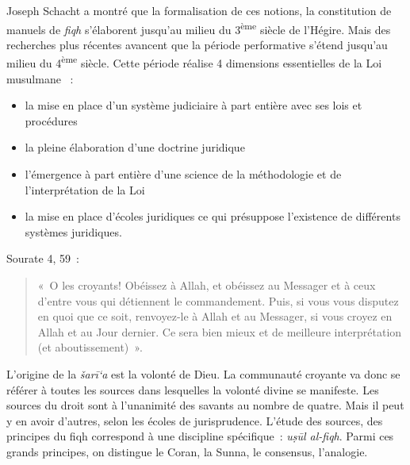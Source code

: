 Joseph Schacht a montré que la formalisation de ces notions, la
constitution de manuels de \emph{fiqh} s'élaborent jusqu'au milieu du
3\textsuperscript{ème} siècle de l'Hégire. Mais des recherches plus
récentes avancent que la période performative s'étend jusqu'au milieu du
4\textsuperscript{ème} siècle. Cette période réalise 4 dimensions
essentielles de la Loi musulmane
~:

\begin{itemize}
\item
  la mise en place d'un système judiciaire à part entière avec ses lois
  et procédures
\item
  la pleine élaboration d'une doctrine juridique
\item
  l'émergence à part entière d'une science de la méthodologie et de
  l'interprétation de la Loi
\item
  la mise en place d'écoles juridiques ce qui présuppose l'existence de
  différents systèmes juridiques.
\end{itemize}


Sourate 4, 59~:


\begin{quote}
«~O les croyants! Obéissez à Allah, et obéissez au Messager et à ceux
d'entre vous qui détiennent le commandement. Puis, si vous vous disputez
en quoi que ce soit, renvoyez-le à Allah et au Messager, si vous croyez
en Allah et au Jour dernier. Ce sera bien mieux et de meilleure
interprétation (et aboutissement)~».
\end{quote}

L'origine de la \emph{šarī`a} est la volonté de Dieu. La communauté
croyante va donc se référer à toutes les sources dans lesquelles la
volonté divine se manifeste. Les sources du droit sont à l'unanimité des
savants au nombre de quatre. Mais il peut y en avoir d'autres, selon les
écoles de jurisprudence. L'étude des sources, des principes du fiqh
correspond à une discipline spécifique~: \emph{uṣūl al-fiqh}. Parmi ces
grands principes, on distingue le Coran, la Sunna, le consensus,
l'analogie.


